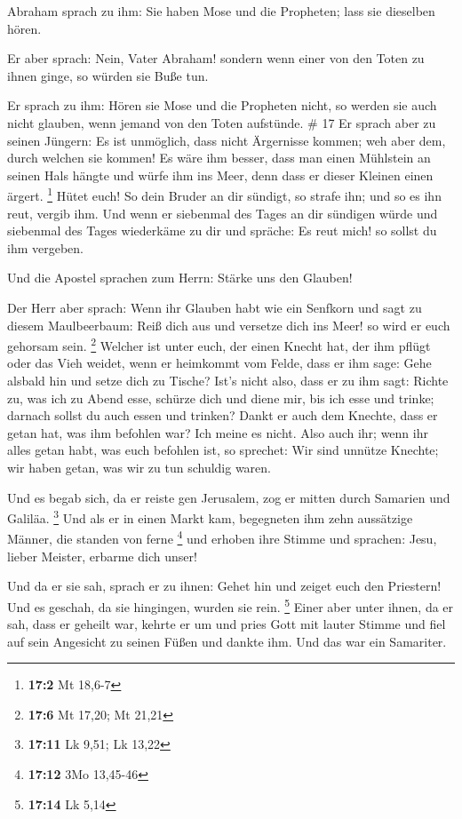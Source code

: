  Abraham sprach zu ihm: Sie haben Mose und die Propheten;
lass sie dieselben hören.

 Er aber sprach: Nein, Vater Abraham! sondern wenn einer
von den Toten zu ihnen ginge, so würden sie Buße tun.

 Er sprach zu ihm: Hören sie Mose und die Propheten
nicht, so werden sie auch nicht glauben, wenn jemand von den Toten
aufstünde. \# 17  Er sprach aber zu seinen Jüngern: Es ist
unmöglich, dass nicht Ärgernisse kommen; weh aber dem, durch welchen sie
kommen!  Es wäre ihm besser, dass man einen Mühlstein an
seinen Hals hängte und würfe ihm ins Meer, denn dass er dieser Kleinen
einen ärgert. \footnote{\textbf{17:2} Mt 18,6-7}  Hütet
euch! So dein Bruder an dir sündigt, so strafe ihn; und so es ihn reut,
vergib ihm.  Und wenn er siebenmal des Tages an dir
sündigen würde und siebenmal des Tages wiederkäme zu dir und spräche: Es
reut mich! so sollst du ihm vergeben.

 Und die Apostel sprachen zum Herrn: Stärke uns den
Glauben!

 Der Herr aber sprach: Wenn ihr Glauben habt wie ein
Senfkorn und sagt zu diesem Maulbeerbaum: Reiß dich aus und versetze
dich ins Meer! so wird er euch gehorsam sein. \footnote{\textbf{17:6} Mt
  17,20; Mt 21,21}  Welcher ist unter euch, der einen
Knecht hat, der ihm pflügt oder das Vieh weidet, wenn er heimkommt vom
Felde, dass er ihm sage: Gehe alsbald hin und setze dich zu Tische?
 Ist's nicht also, dass er zu ihm sagt: Richte zu, was ich
zu Abend esse, schürze dich und diene mir, bis ich esse und trinke;
darnach sollst du auch essen und trinken?  Dankt er auch
dem Knechte, dass er getan hat, was ihm befohlen war? Ich meine es
nicht.  Also auch ihr; wenn ihr alles getan habt, was
euch befohlen ist, so sprechet: Wir sind unnütze Knechte; wir haben
getan, was wir zu tun schuldig waren.

 Und es begab sich, da er reiste gen Jerusalem, zog er
mitten durch Samarien und Galiläa. \footnote{\textbf{17:11} Lk 9,51; Lk
  13,22}  Und als er in einen Markt kam, begegneten ihm
zehn aussätzige Männer, die standen von ferne \footnote{\textbf{17:12}
  3Mo 13,45-46}  und erhoben ihre Stimme und sprachen:
Jesu, lieber Meister, erbarme dich unser!

 Und da er sie sah, sprach er zu ihnen: Gehet hin und
zeiget euch den Priestern! Und es geschah, da sie hingingen, wurden sie
rein. \footnote{\textbf{17:14} Lk 5,14}  Einer aber unter
ihnen, da er sah, dass er geheilt war, kehrte er um und pries Gott mit
lauter Stimme  und fiel auf sein Angesicht zu seinen
Füßen und dankte ihm. Und das war ein Samariter.

